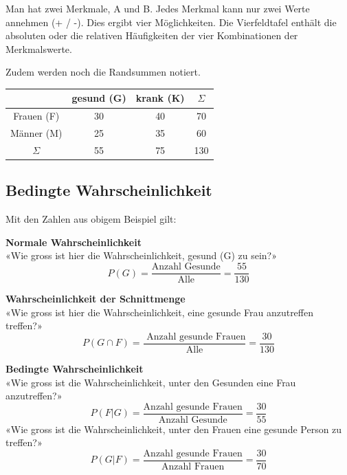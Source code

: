 \begin{multicols}{2}
Man hat zwei Merkmale, A und B. Jedes Merkmal kann nur zwei Werte
annehmen (+ / -). Dies ergibt vier Möglichkeiten. Die Vierfeldtafel
enthält die absoluten oder die relativen Häufigkeiten der vier
Kombinationen der Merkmalswerte.

Zudem werden noch die Randsummen notiert.


\begin{tabular}{c|c|c|c}
           & gesund (G)& krank (K)& $\Sigma$ \\\hline
Frauen (F) &        30 &       40 &       70 \\\hline
Männer (M) &        25 &       35 &       60 \\\hline
$\Sigma$   &        55 &       75 &      130 \\\hline
 \end{tabular}



\subsection*{Bedingte Wahrscheinlichkeit}


Mit den Zahlen aus obigem Beispiel gilt:

\textbf{Normale Wahrscheinlichkeit}\\
«Wie gross ist hier die Wahrscheinlichkeit, gesund (G) zu sein?»
$$P(G) = \frac{\textrm{Anzahl Gesunde}}{\textrm{Alle}} =  \frac{55}{130}$$

\textbf{Wahrscheinlichkeit der Schnittmenge}\\
«Wie gross ist hier die Wahrscheinlichkeit, eine gesunde Frau anzutreffen treffen?»
$$P(G\cap F) = \frac{\textrm{\ Anzahl gesunde Frauen}}{\textrm{Alle}}= \frac{30}{130}$$

\textbf{Bedingte Wahrscheinlichkeit}\\
«Wie gross ist die Wahrscheinlichkeit, unter den Gesunden eine Frau anzutreffen?»
$$P(F | G) = \frac{\textrm{Anzahl gesunde Frauen}}{\textrm{Anzahl Gesunde}} =  \frac{30}{55}$$
«Wie gross ist die Wahrscheinlichkeit, unter den Frauen eine gesunde Person zu treffen?»
$$P(G | F) = \frac{\textrm{Anzahl gesunde Frauen}}{\textrm{Anzahl Frauen}}=  \frac{30}{70}$$

\end{multicols}


